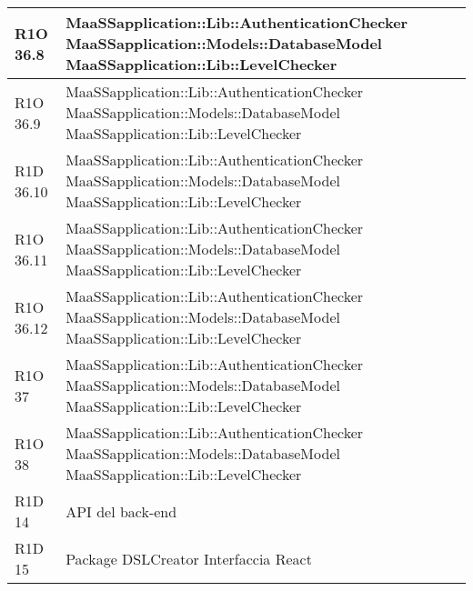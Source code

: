 \begin{center}
\begin{longtable}{ | l | p{8cm} |}
   	R1O 36.8 & MaaSSapplication::Lib::AuthenticationChecker \newline  MaaSSapplication::Models::DatabaseModel \newline MaaSSapplication::Lib::LevelChecker \\ \hline
   	
   	R1O 36.9 & MaaSSapplication::Lib::AuthenticationChecker \newline  MaaSSapplication::Models::DatabaseModel \newline MaaSSapplication::Lib::LevelChecker \\ \hline
   	
   	R1D 36.10 & MaaSSapplication::Lib::AuthenticationChecker \newline  MaaSSapplication::Models::DatabaseModel \newline MaaSSapplication::Lib::LevelChecker \\ \hline
   	
   	R1O 36.11 & MaaSSapplication::Lib::AuthenticationChecker \newline  MaaSSapplication::Models::DatabaseModel \newline MaaSSapplication::Lib::LevelChecker \\ \hline
   	
   	R1O 36.12 & MaaSSapplication::Lib::AuthenticationChecker \newline  MaaSSapplication::Models::DatabaseModel \newline MaaSSapplication::Lib::LevelChecker \\ \hline
   	
   	R1O 37 & MaaSSapplication::Lib::AuthenticationChecker \newline  MaaSSapplication::Models::DatabaseModel \newline MaaSSapplication::Lib::LevelChecker \\ \hline
   	
   	R1O 38 & MaaSSapplication::Lib::AuthenticationChecker \newline  MaaSSapplication::Models::DatabaseModel \newline MaaSSapplication::Lib::LevelChecker \\ \hline

	R1D 14 & API del back-end \\ \hline
	
	R1D 15 & Package DSLCreator \newline Interfaccia React \\ \hline


\end{longtable}
\end{center}
